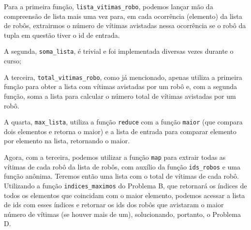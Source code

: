 Para a primeira função, \texttt{lista\_vitimas\_robo}, podemos lançar mão da compreensão de lista mais uma vez para, em cada ocorrência (elemento) da lista de robôs, extrairmos o número de vítimas avistadas nessa ocorrência se o robô da tupla em questão tiver o id de entrada.

A segunda, \texttt{soma\_lista}, é trivial e foi implementada diversas vezes durante o curso;

A terceira, \texttt{total\_vitimas\_robo}, como já mencionado, apenas utiliza a primeira função para obter a lista com vítimas avistadas por um robô e, com a segunda função, soma a lista para calcular o número total de vítimas avistadas por um robô.

A quarta, \texttt{max\_lista}, utiliza a função \texttt{reduce} com a função \texttt{maior} (que compara dois elementos e retorna o maior) e a lista de entrada para comparar elemento por elemento na lista, retornando o maior.

Agora, com a terceira, podemos utilizar a função \texttt{map} para extrair todas as vítimas de cada robô da lista de robôs, com auxílio da função \texttt{ids\_robos} e uma função anônima. Teremos então uma lista com o total de vítimas de cada robô. Utilizando a função \texttt{indices\_maximos} do Problema B, que retornará os índices de todos os elementos que coincidam com o maior elemento, podemos acessar a lista de ids com esses índices e retornar os ids dos robôs que avistaram o maior número de vítimas (se houver mais de um), solucionando, portanto, o Problema D.


